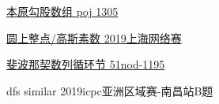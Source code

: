 
\vbox{}

\vbox{}

\begin{problemset}
	\item \href{http://poj.org/problem?id=1305}{本原勾股数组 \quad poj 1305}
	\item \href{https://nanti.jisuanke.com/t/41421}{圆上整点/高斯素数 \quad 2019上海网络赛}
	\item \href{https://www.51nod.com/Challenge/Problem.html#problemId=1195}{斐波那契数列循环节 \quad 51nod-1195}
	\item dfs similar \quad 2019icpc亚洲区域赛-南昌站B题
\end{problemset}


\nocite{*} 

